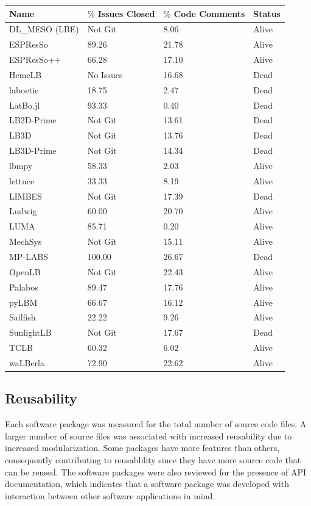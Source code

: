 \documentclass[12pt, notitlepage]{article}
\begin{document}
\begin{onehalfspacing}
\begin{center}
	\begin{tabular}{ p{3.5cm}p{3.5cm}p{3.5cm}p{2.5cm} }
		\hline
		Name & $\%$ Issues Closed & $\%$ Code Comments& Status\\
		\hline
		DL\_MESO (LBE) & Not Git & 8.06&Alive\\
		ESPResSo & 89.26 & 21.78&Alive\\
		ESPResSo++ & 66.28 & 17.10&Alive\\
		HemeLB & No Issues & 16.68&Dead\\
		laboetie & 18.75 & 2.47&Dead\\		
		LatBo.jl & 93.33 & 0.40&Dead\\
		LB2D-Prime & Not Git & 13.61&Dead\\
		LB3D & Not Git & 13.76&Dead\\
		LB3D-Prime & Not Git & 14.34&Dead\\
		lbmpy& 58.33  & 2.03  &Alive\\
		lettuce & 33.33 & 8.19&Alive\\
		LIMBES & Not Git & 17.39&Dead\\
		Ludwig& 60.00 & 20.70&Alive\\
		LUMA& 85.71   & 0.20&Alive\\
		MechSys & Not Git & 15.11&Alive\\
		MP-LABS & 100.00 & 26.67&Dead\\
		OpenLB & Not Git & 22.43&Alive\\
		Palabos & 89.47 & 17.76&Alive\\
		pyLBM & 66.67& 16.12&Alive\\
		Sailfish & 22.22 & 9.26&Alive\\
		SunlightLB & Not Git & 17.67&Dead\\
		TCLB & 60.32 & 6.02&Alive\\
		waLBerla & 72.90 & 22.62&Alive\\
		\hline
	\end{tabular}
	\label{gitrepodata}
\end{center}
\end{onehalfspacing}

\subsection{Reusability}\label{reusabilityresults}

Each software package was measured for the total number of source code files. A larger number of source files was associated with increased reusability due to increased modularization. Some packages have more features than others, consequently contributing to reusablility since they have more source code that can be reused. The software packages were also reviewed for the presence of API documentation, which indicates that a software package was developed with interaction between other software applications in mind. 
\end{document}
